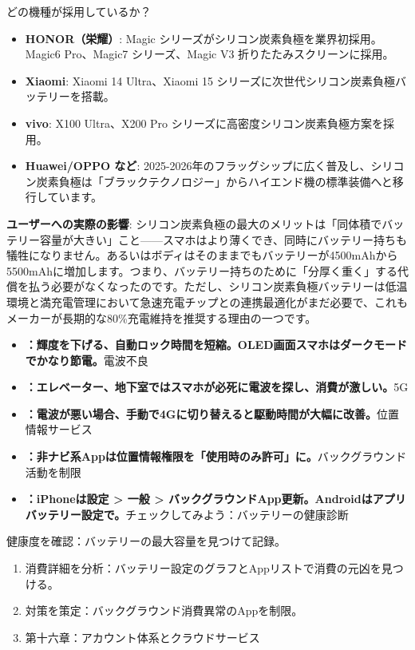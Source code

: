 \begin{tcbinfo}{どの機種が採用しているか？}
\begin{itemize}
  \item \textbf{HONOR（栄耀）}: Magic シリーズがシリコン炭素負極を業界初採用。Magic6 Pro、Magic7 シリーズ、Magic V3 折りたたみスクリーンに採用。
  \item \textbf{Xiaomi}: Xiaomi 14 Ultra、Xiaomi 15 シリーズに次世代シリコン炭素負極バッテリーを搭載。
  \item \textbf{vivo}: X100 Ultra、X200 Pro シリーズに高密度シリコン炭素負極方案を採用。
  \item \textbf{Huawei/OPPO など}: 2025-2026年のフラッグシップに広く普及し、シリコン炭素負極は「ブラックテクノロジー」からハイエンド機の標準装備へと移行しています。
\end{itemize}

\end{tcbinfo}

\textbf{ユーザーへの実際の影響}: シリコン炭素負極の最大のメリットは「同体積でバッテリー容量が大きい」こと——スマホはより薄くでき、同時にバッテリー持ちも犠牲になりません。あるいはボディはそのままでもバッテリーが4500mAhから5500mAhに増加します。つまり、バッテリー持ちのために「分厚く重く」する代償を払う必要がなくなったのです。ただし、シリコン炭素負極バッテリーは低温環境と満充電管理において急速充電チップとの連携最適化がまだ必要で、これもメーカーが長期的な80\%充電維持を推奨する理由の一つです。


\begin{itemize}
  \item \textbf{：輝度を下げる、自動ロック時間を短縮。OLED画面スマホはダークモードでかなり節電。}電波不良
  \item \textbf{：エレベーター、地下室ではスマホが必死に電波を探し、消費が激しい。}5G
  \item \textbf{：電波が悪い場合、手動で4Gに切り替えると駆動時間が大幅に改善。}位置情報サービス
  \item \textbf{：非ナビ系Appは位置情報権限を「使用時のみ許可」に。}バックグラウンド活動を制限
  \item \textbf{：iPhoneは設定 > 一般 > バックグラウンドApp更新。Androidはアプリバッテリー設定で。}チェックしてみよう：バッテリーの健康診断
\end{itemize}

\begin{tcbpractice}{健康度を確認：バッテリーの最大容量を見つけて記録。}
\begin{enumerate}
  \item 消費詳細を分析：バッテリー設定のグラフとAppリストで消費の元凶を見つける。
  \item 対策を策定：バックグラウンド消費異常のAppを制限。
  \item 第十六章：アカウント体系とクラウドサービス
\end{enumerate}

\end{tcbpractice}
